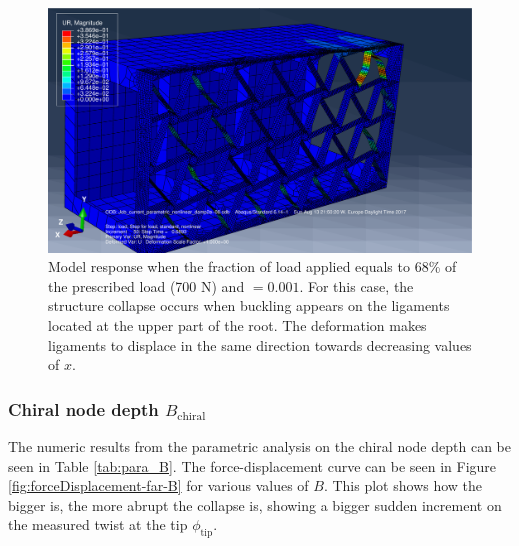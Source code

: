       \begin{figure}[!htpb] %
        \centering
        \includegraphics[width=0.8 \textwidth]{../figures/result-sim/eccen/0coma001_UR}
        \caption[Model response when the fraction of load applied equals to 68\% of the prescribed load (700 N) and \chie$= 0.001$]{Model response when the fraction of load applied equals to 68\% of the prescribed load (700 N) and \chie$= 0.001$. For this case, the structure collapse occurs when buckling appears on the ligaments located at the upper part of the root. The deformation makes ligaments to displace in the same direction towards decreasing values of $x$.}
        \label{fig:0coma001_UR}
      \end{figure}


    \clearpage
    \subsubsection{Chiral node depth $B_{\mathrm{chiral}}$}

      The numeric results from the parametric analysis on the chiral node depth \chiB can be seen in Table \ref{tab:para_B}. The force-displacement curve can be seen in Figure \ref{fig:forceDisplacement-far-B} for various values of $B$. This plot shows how the bigger \chiB is, the more abrupt the collapse is, showing a bigger sudden increment on the measured twist at the tip $\phi_{\mathrm{tip}}$. 

